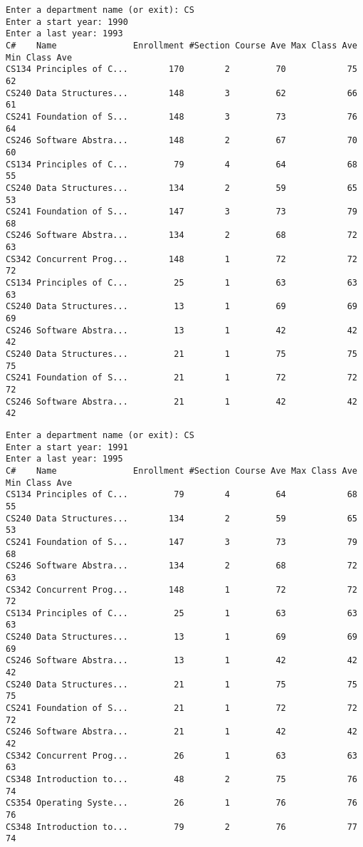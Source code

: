 \documentclass[12pt]{article}
\begin{document}
\begin{verbatim}
Enter a department name (or exit): CS
Enter a start year: 1990
Enter a last year: 1993
C#    Name               Enrollment #Section Course Ave Max Class Ave Min Class Ave
CS134 Principles of C...        170        2         70            75            62
CS240 Data Structures...        148        3         62            66            61
CS241 Foundation of S...        148        3         73            76            64
CS246 Software Abstra...        148        2         67            70            60
CS134 Principles of C...         79        4         64            68            55
CS240 Data Structures...        134        2         59            65            53
CS241 Foundation of S...        147        3         73            79            68
CS246 Software Abstra...        134        2         68            72            63
CS342 Concurrent Prog...        148        1         72            72            72
CS134 Principles of C...         25        1         63            63            63
CS240 Data Structures...         13        1         69            69            69
CS246 Software Abstra...         13        1         42            42            42
CS240 Data Structures...         21        1         75            75            75
CS241 Foundation of S...         21        1         72            72            72
CS246 Software Abstra...         21        1         42            42            42
\end{verbatim}

\begin{verbatim}
Enter a department name (or exit): CS
Enter a start year: 1991
Enter a last year: 1995
C#    Name               Enrollment #Section Course Ave Max Class Ave Min Class Ave
CS134 Principles of C...         79        4         64            68            55
CS240 Data Structures...        134        2         59            65            53
CS241 Foundation of S...        147        3         73            79            68
CS246 Software Abstra...        134        2         68            72            63
CS342 Concurrent Prog...        148        1         72            72            72
CS134 Principles of C...         25        1         63            63            63
CS240 Data Structures...         13        1         69            69            69
CS246 Software Abstra...         13        1         42            42            42
CS240 Data Structures...         21        1         75            75            75
CS241 Foundation of S...         21        1         72            72            72
CS246 Software Abstra...         21        1         42            42            42
CS342 Concurrent Prog...         26        1         63            63            63
CS348 Introduction to...         48        2         75            76            74
CS354 Operating Syste...         26        1         76            76            76
CS348 Introduction to...         79        2         76            77            74
\end{verbatim}
\end{document}
